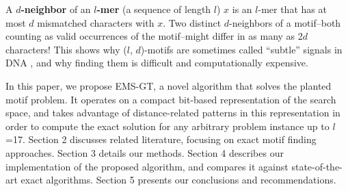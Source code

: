 \documentclass[conference]{IEEEtran}
\begin{document}
	A {\boldmath \textbf{$d$-neighbor} of an \textbf{$l$-mer}} (a sequence of length $l$) $x$ is an $l$-mer that has at most $d$ mismatched characters with $x$.  Two distinct $d$-neighbors of a motif--both counting as valid occurrences of the motif--might differ in as many as 2$d$ characters! This shows why ($l$, $d$)-motifs are sometimes called “subtle” signals in DNA  \cite{pevzner2000combinatorial}, and why finding them is difficult and computationally expensive.

	In this paper, we propose EMS-GT, a novel algorithm that solves the planted motif problem. It operates on a compact bit-based representation of the search space, and takes advantage of distance-related patterns in this representation in order to compute the exact solution for any arbitrary problem instance up to $l$=17. Section 2 discusses related literature, focusing on exact motif finding approaches. Section 3 details our methods. Section 4 describes our implementation of the proposed algorithm, and compares it against state-of-the-art exact algorithms. Section 5 presents our conclusions and recommendations.
\end{document}
